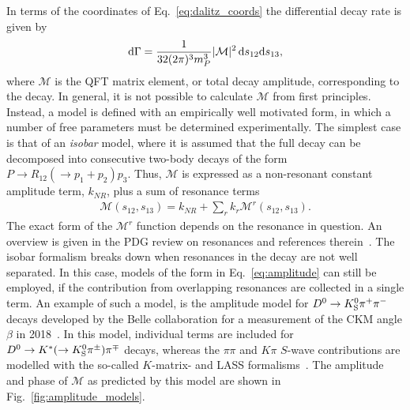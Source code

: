 In terms of the coordinates of Eq.~\eqref{eq:dalitz_coords} the differential decay rate is given by
\begin{align}
    \text d \Gamma = \frac{1}{32(2\pi)^3 m^3_P} |\mathcal M|^2 \,\text d s_{12} \text d s_{13},
\end{align}
where $\mathcal M$ is the QFT matrix element, or total decay amplitude, corresponding to the decay. In general, it is not possible to calculate $\mathcal M$ from first principles. Instead, a model is defined with an empirically well motivated form, in which a number of free parameters must be determined experimentally. The simplest case is that of an \emph{isobar} model, where it is assumed that the full decay can be decomposed into consecutive two-body decays of the form $P \to R_{12} (\to p_1 + p_2) p_3$. Thus, $\mathcal M$ is expressed as a non-resonant constant amplitude term, $k_{NR}$, plus a sum of resonance terms
\begin{align}\label{eq:amplitude}
    \mathcal M (s_{12}, s_{13}) = k_{NR} + \sum_r k_r \mathcal M^r(s_{12}, s_{13}).
\end{align}
The exact form of the $\mathcal M^r$ function depends on the resonance in question. An overview is given in the PDG review on resonances and references therein~\cite{PDG2019}. The isobar formalism breaks down when resonances in the decay are not well separated. In this case, models of the form in Eq.~\eqref{eq:amplitude} can still be employed, if the contribution from overlapping resonances are collected in a single term. An example of such a model, is the amplitude model for ${{D}^0}\rightarrow{\ensuremath{{K}^0_{\mathrm{S}}}}{\ensuremath{{\pi}^+}}{\ensuremath{{\pi}^-}}$ decays developed by the Belle collaboration for a measurement of the CKM angle $\beta$ in 2018~\cite{Belle2018}. In this model, individual terms are included for ${{D}^0}\rightarrow{\ensuremath{{K}^*}}(\rightarrow{\ensuremath{{K}^0_{\mathrm{S}}}}\pi^\pm){{\pi}^\mp}$ decays, whereas the $\pi\pi$ and $K\pi$  $S$-wave contributions are modelled with the so-called $K$-matrix- and LASS formalisms~\cite{chungPartialWaveAnalysis1995,astonStudyScatteringReaction1988}. The amplitude and phase of $\mathcal M$ as predicted by this model are shown in Fig.~\ref{fig:amplitude_models}.

